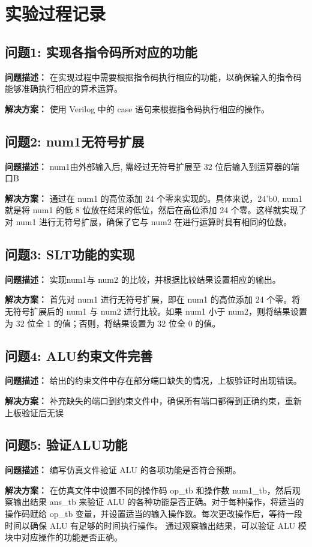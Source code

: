 \section{实验过程记录}

\subsection{问题1: 实现各指令码所对应的功能}
\textbf{问题描述：} 在实现过程中需要根据指令码执行相应的功能，以确保输入的指令码能够准确执行相应的算术运算。

\textbf{解决方案：} 使用 Verilog 中的 case 语句来根据指令码执行相应的操作。

\subsection{问题2: num1无符号扩展}
\textbf{问题描述：} num1由外部输入后, 需经过无符号扩展至 32 位后输入到运算器的端口B

\textbf{解决方案：} 通过在 num1 的高位添加 24 个零来实现的。具体来说，{24'b0, num1} 就是将 num1 的低 8 位放在结果的低位，然后在高位添加 24 个零。这样就实现了对 num1 进行无符号扩展，确保了它与 num2 在进行运算时具有相同的位数。

\subsection{问题3: SLT功能的实现}
\textbf{问题描述：} 实现num1与 num2 的比较，并根据比较结果设置相应的输出。

\textbf{解决方案：} 首先对 num1 进行无符号扩展，即在 num1 的高位添加 24 个零。将无符号扩展后的 num1 与 num2 进行比较。如果 num1 小于 num2，则将结果设置为 32 位全 1 的值；否则，将结果设置为 32 位全 0 的值。

\subsection{问题4: ALU约束文件完善}
\textbf{问题描述：} 给出的约束文件中存在部分端口缺失的情况，上板验证时出现错误。

\textbf{解决方案：} 补充缺失的端口到约束文件中，确保所有端口都得到正确约束，重新上板验证后无误

\subsection{问题5: 验证ALU功能}
\textbf{问题描述：} 编写仿真文件验证 ALU 的各项功能是否符合预期。

\textbf{解决方案：} 在仿真文件中设置不同的操作码 op\_tb 和操作数 num1\_tb，然后观察输出结果 ans\_tb 来验证 ALU 的各种功能是否正确。对于每种操作，将适当的操作码赋给 op\_tb 变量，并设置适当的输入操作数。每次更改操作后，等待一段时间以确保 ALU 有足够的时间执行操作。 通过观察输出结果，可以验证 ALU 模块中对应操作的功能是否正确。

